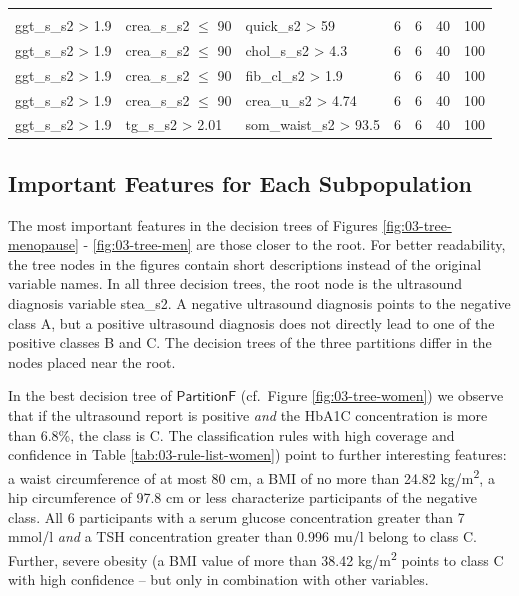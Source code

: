 \documentclass[
  oneside]{book}
\begin{document}
\begin{table}
\begin{tabular}[t]{lllrrrr}
\addlinespace[0.3em]
\multicolumn{7}{l}{\textbf{Target class: C}}\\
\hspace{1em}ggt\_s\_s2 > 1.9 & crea\_s\_s2 $\leq$ 90 & quick\_s2 > 59 & 6 & 6 & 40 & 100\\
\hspace{1em}ggt\_s\_s2 > 1.9 & crea\_s\_s2 $\leq$ 90 & chol\_s\_s2 > 4.3 & 6 & 6 & 40 & 100\\
\hspace{1em}ggt\_s\_s2 > 1.9 & crea\_s\_s2 $\leq$ 90 & fib\_cl\_s2 > 1.9 & 6 & 6 & 40 & 100\\
\hspace{1em}ggt\_s\_s2 > 1.9 & crea\_s\_s2 $\leq$ 90 & crea\_u\_s2 > 4.74 & 6 & 6 & 40 & 100\\
\hspace{1em}ggt\_s\_s2 > 1.9 & tg\_s\_s2 > 2.01 & som\_waist\_s2 > 93.5 & 6 & 6 & 40 & 100\\
\bottomrule
\end{tabular}
\end{table}

\hypertarget{imm-important-features}{%
\subsection{Important Features for Each Subpopulation}\label{imm-important-features}}

The most important features in the decision trees of Figures \ref{fig:03-tree-menopause} - \ref{fig:03-tree-men} are those closer to the root.
For better readability, the tree nodes in the figures contain short descriptions instead of the original variable names.
In all three decision trees, the root node is the ultrasound diagnosis variable stea\_s2.
A negative ultrasound diagnosis points to the negative class A, but
a positive ultrasound diagnosis does not directly lead to one of the positive classes B and C.
The decision trees of the three partitions differ in the nodes placed near the root.

In the best decision tree of \(\mathsf{PartitionF}\) (cf.~Figure \ref{fig:03-tree-women}) we observe that
if the ultrasound report is positive \emph{and} the HbA1C concentration is more than 6.8\%, the class is C.
The classification rules with high coverage and confidence in Table \ref{tab:03-rule-list-women}) point to further interesting features:
a waist circumference of at most 80 cm, a BMI of no more than 24.82 kg/m\textsuperscript{2}, a hip circumference of 97.8 cm or less characterize participants of the negative class.
All 6 participants with a serum glucose concentration greater than 7 mmol/l \emph{and} a TSH concentration greater than 0.996 mu/l belong to class C.
Further, severe obesity (a BMI value of more than 38.42 kg/m\textsuperscript{2} points to class C with high confidence -- but only in combination with other variables.
\end{document}
